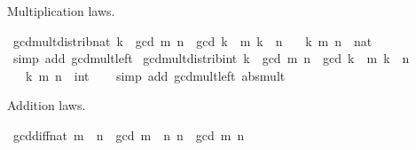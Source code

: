 \begin{isabellebody}
\begin{isamarkuptext}
\medskip Multiplication laws.%
\end{isamarkuptext}\isamarkuptrue%
\isamarkupfalse%
\ gcd{\isacharunderscore}{\kern0pt}mult{\isacharunderscore}{\kern0pt}distrib{\isacharunderscore}{\kern0pt}nat{\isacharcolon}{\kern0pt}\ {\isachardoublequoteopen}k\ {\isacharasterisk}{\kern0pt}\ gcd\ m\ n\ {\isacharequal}{\kern0pt}\ gcd\ {\isacharparenleft}{\kern0pt}k\ {\isacharasterisk}{\kern0pt}\ m{\isacharparenright}{\kern0pt}\ {\isacharparenleft}{\kern0pt}k\ {\isacharasterisk}{\kern0pt}\ n{\isacharparenright}{\kern0pt}{\isachardoublequoteclose}\isanewline
\ \ \ k\ m\ n\ {\isacharcolon}{\kern0pt}{\isacharcolon}{\kern0pt}\ nat\isanewline
\ \ %
\isanewline
%
\isadelimproof
\ \ %
\endisadelimproof
%
\isatagproof
{}\isamarkupfalse%
\ {\isacharparenleft}{\kern0pt}simp\ add{\isacharcolon}{\kern0pt}\ gcd{\isacharunderscore}{\kern0pt}mult{\isacharunderscore}{\kern0pt}left{\isacharparenright}{\kern0pt}%
\endisatagproof
{\isafoldproof}%
%
\isadelimproof
\isanewline
%
\endisadelimproof
\isanewline
{}\isamarkupfalse%
\ gcd{\isacharunderscore}{\kern0pt}mult{\isacharunderscore}{\kern0pt}distrib{\isacharunderscore}{\kern0pt}int{\isacharcolon}{\kern0pt}\ {\isachardoublequoteopen}{\isasymbar}k{\isasymbar}\ {\isacharasterisk}{\kern0pt}\ gcd\ m\ n\ {\isacharequal}{\kern0pt}\ gcd\ {\isacharparenleft}{\kern0pt}k\ {\isacharasterisk}{\kern0pt}\ m{\isacharparenright}{\kern0pt}\ {\isacharparenleft}{\kern0pt}k\ {\isacharasterisk}{\kern0pt}\ n{\isacharparenright}{\kern0pt}{\isachardoublequoteclose}\isanewline
\ \ \ k\ m\ n\ {\isacharcolon}{\kern0pt}{\isacharcolon}{\kern0pt}\ int\isanewline
%
\isadelimproof
\ \ %
\endisadelimproof
%
\isatagproof
{}\isamarkupfalse%
\ {\isacharparenleft}{\kern0pt}simp\ add{\isacharcolon}{\kern0pt}\ gcd{\isacharunderscore}{\kern0pt}mult{\isacharunderscore}{\kern0pt}left\ abs{\isacharunderscore}{\kern0pt}mult{\isacharparenright}{\kern0pt}%
\endisatagproof
{\isafoldproof}%
%
\isadelimproof
%
\endisadelimproof
%
\begin{isamarkuptext}%
\medskip Addition laws.%
\end{isamarkuptext}\isamarkuptrue%
\isamarkupfalse%
\ gcd{\isacharunderscore}{\kern0pt}diff{}{\isacharunderscore}{\kern0pt}nat{\isacharcolon}{\kern0pt}\ {\isachardoublequoteopen}m\ {\isasymge}\ n\ {\isasymLongrightarrow}\ gcd\ {\isacharparenleft}{\kern0pt}m\ {\isacharminus}{\kern0pt}\ n{\isacharparenright}{\kern0pt}\ n\ {\isacharequal}{\kern0pt}\ gcd\ m\ n{\isachardoublequoteclose}\isanewline

\end{isabellebody}
